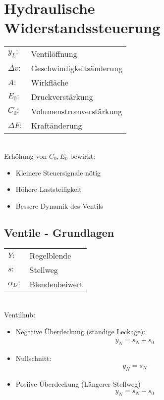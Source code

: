 \section{Hydraulische Widerstandssteuerung}

\begin{tabular}{ll}
$y_L:$ & Ventilöffnung \\
$\Delta v:$ & Geschwindigkeitsänderung \\
$A:$ & Wirkfläche \\
$E_0:$ & Druckverstärkung \\
$C_0:$ & Volumenstromverstärkung \\
$\Delta F:$ & Kraftänderung
\end{tabular} \\

Erhöhung von $C_0, E_0$ bewirkt:
\begin{itemize}
\item Kleinere Steuersignale nötig 
\item Höhere Laststeifigkeit 
\item Bessere Dynamik des Ventils
\end{itemize}


\subsection{Ventile - Grundlagen}
\begin{tabular}{ll}
$Y:$ & Regelblende \\
$s:$ & Stellweg \\
$\alpha_D:$ & Blendenbeiwert
\end{tabular} \\


Ventilhub: 
\begin{itemize}
\item Negative Überdeckung (ständige Leckage):
\begin{align*}
y_N = s_N + s_0 
\end{align*}
\item Nullschnitt:
\begin{align*}
y_N = s_N
\end{align*}
\item Posiive Überdeckung (Längerer Stellweg)
\begin{align*}
y_N = s_N - s_0
\end{align*}
\end{itemize}


